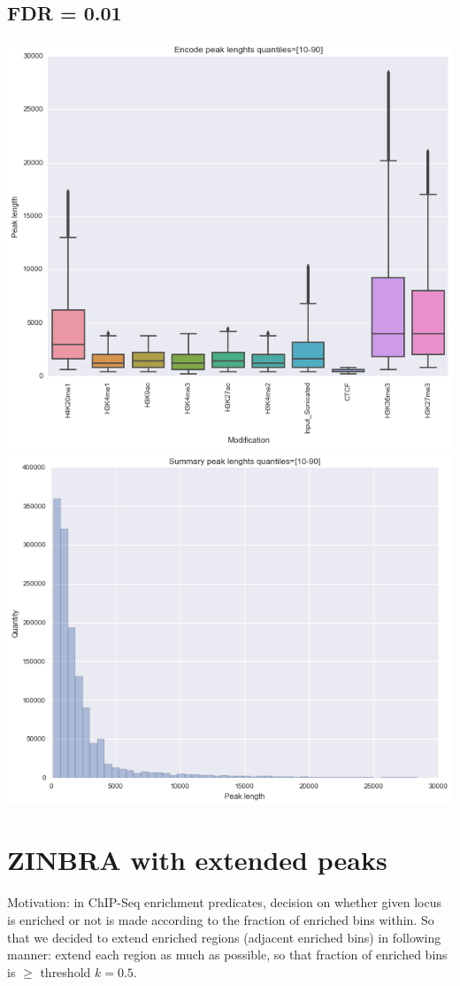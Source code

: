 \documentclass{article}
\begin{document}
\subsection{FDR = 0.01}
\includegraphics[width=0.5\linewidth]{zinbra1e2.png}
\includegraphics[width=0.5\linewidth]{zinbra1e22.png}

\newpage
\section{ZINBRA with extended peaks}
Motivation: in ChIP-Seq enrichment predicates, decision on whether given locus is enriched or not is made according to the fraction of enriched bins within. So that we decided to extend enriched regions (adjacent enriched bins) in following manner: extend each region as much as possible, so that fraction of enriched bins is $\geq$ threshold $k=0.5$. 
\end{document}
